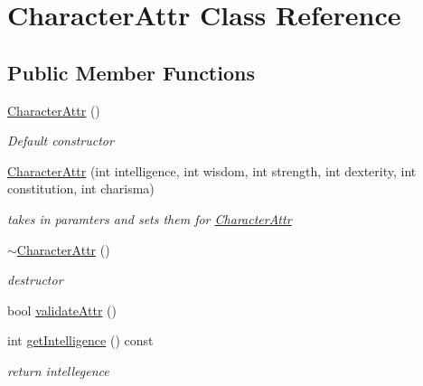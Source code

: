 \hypertarget{class_character_attr}{}\section{Character\+Attr Class Reference}
\label{class_character_attr}
\subsection*{Public Member Functions}
\begin{DoxyCompactItemize}
\item 
\hypertarget{class_character_attr_ae219d0b5b337bf86fe3494fee904a6ef}{}\label{class_character_attr_ae219d0b5b337bf86fe3494fee904a6ef} 
\hyperlink{class_character_attr_ae219d0b5b337bf86fe3494fee904a6ef}{Character\+Attr} ()
\begin{DoxyCompactList}\small\item\em Default constructor \end{DoxyCompactList}\item 
\hypertarget{class_character_attr_a0cf13266e8a0d8e884b32ca53149e31a}{}\label{class_character_attr_a0cf13266e8a0d8e884b32ca53149e31a} 
\hyperlink{class_character_attr_a0cf13266e8a0d8e884b32ca53149e31a}{Character\+Attr} (int intelligence, int wisdom, int strength, int dexterity, int constitution, int charisma)
\begin{DoxyCompactList}\small\item\em takes in paramters and sets them for \hyperlink{class_character_attr}{Character\+Attr} \end{DoxyCompactList}\item 
\hypertarget{class_character_attr_aa23e19b1a020abc8e33405b44b38e1cb}{}\label{class_character_attr_aa23e19b1a020abc8e33405b44b38e1cb} 
\hyperlink{class_character_attr_aa23e19b1a020abc8e33405b44b38e1cb}{$\sim$\+Character\+Attr} ()
\begin{DoxyCompactList}\small\item\em destructor \end{DoxyCompactList}\item 
bool \hyperlink{class_character_attr_ad66d6304128855485a07bdffa0d28e7b}{validate\+Attr} ()
\item 
\hypertarget{class_character_attr_a880bd4d03dcc98dbd3417808eaa69778}{}\label{class_character_attr_a880bd4d03dcc98dbd3417808eaa69778} 
int \hyperlink{class_character_attr_a880bd4d03dcc98dbd3417808eaa69778}{get\+Intelligence} () const
\begin{DoxyCompactList}\small\item\em return intellegence \end{DoxyCompactList}\item 

\end{DoxyCompactItemize}
